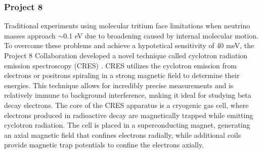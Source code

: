 \subsubsection*{Project 8}

Traditional experiments using molecular tritium face limitations when neutrino masses approach $\sim$0.1 eV
due to broadening caused by internal molecular motion. To overcome these problems and achieve a hypotetical sensitivity
of 40 meV, the Project 8 Collaboration developed a novel technique called cyclotron radiation emission
spectroscopy (CRES) \cite{P8esfahani2017determining}. CRES utilizes the cyclotron emission from electrons or positrons
spiraling in a strong magnetic field to
determine their energies. This technique allows for incredibly precise measurements and is relatively immune to background interference, making it ideal for studying beta decay electrons.
The core of the CRES apparatus is a cryogenic gas cell, where electrons produced in radioactive decay are magnetically
trapped while emitting cyclotron radiation. The cell is placed in a superconducting magnet, generating an axial magnetic
field that confines electrons radially, while additional coils provide magnetic trap potentials to confine the electrons axially.

